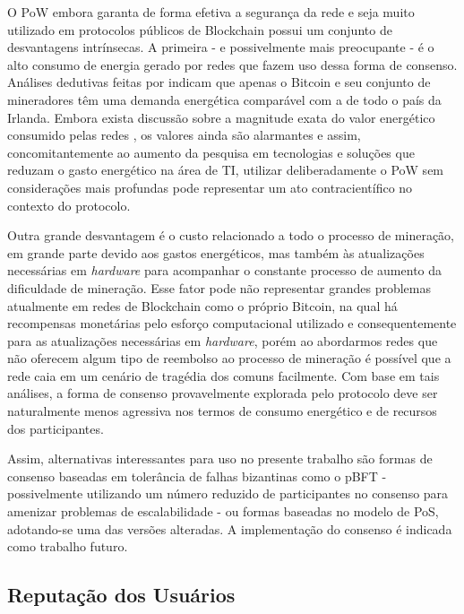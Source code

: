 %
O \ac{PoW} embora garanta de forma efetiva a segurança da rede e seja muito utilizado em protocolos públicos de Blockchain possui um conjunto de desvantagens intrínsecas. A primeira - e possivelmente mais preocupante - é o alto consumo de energia gerado por redes que fazem uso dessa forma de consenso. Análises dedutivas feitas por  indicam que apenas o Bitcoin e seu conjunto de mineradores têm uma demanda energética comparável com a de todo o país da Irlanda.
%
Embora exista discussão sobre a magnitude exata do valor energético consumido pelas redes \cite{blockchain:contraponto_energia}, os valores ainda são alarmantes e assim, concomitantemente ao aumento da pesquisa em tecnologias e soluções que reduzam o gasto energético na área de TI, utilizar deliberadamente o \ac{PoW} sem considerações mais profundas pode representar um ato contracientífico no contexto do protocolo.

%
Outra grande desvantagem é o custo relacionado a todo o processo de mineração, em grande parte devido aos gastos energéticos, mas também às atualizações necessárias em \textit{hardware} para acompanhar o constante processo de aumento da dificuldade de mineração. Esse fator pode não representar grandes problemas atualmente em redes de Blockchain como o próprio Bitcoin, na qual há recompensas monetárias pelo esforço computacional utilizado e consequentemente para as atualizações necessárias em \textit{hardware}, porém ao abordarmos redes que não oferecem algum tipo de reembolso ao processo de mineração é possível que a rede caia em um cenário de tragédia dos comuns facilmente. 
%
Com base em tais análises, a forma de consenso provavelmente explorada pelo protocolo deve ser naturalmente menos agressiva nos termos de consumo energético e de recursos dos participantes.

%
Assim, alternativas interessantes para uso no presente trabalho são formas de consenso baseadas em tolerância de falhas bizantinas como o \ac{pBFT} - possivelmente utilizando um número reduzido de participantes no consenso para amenizar problemas de escalabilidade - ou formas baseadas no modelo de \ac{PoS}, adotando-se uma das versões alteradas.
A implementação do consenso é indicada como trabalho futuro.

\subsection{Reputação dos Usuários}


